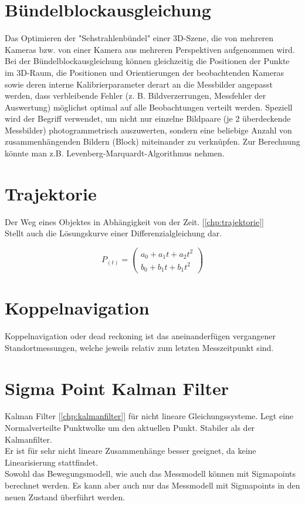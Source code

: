 \section{Bündelblockausgleichung}
\label{chp:stoffübersicht:sec:Bündelblockausgleichung}
Das Optimieren der "Sehstrahlenbündel" einer 3D-Szene, die von mehreren Kameras bzw. von einer Kamera aus mehreren Perspektiven
aufgenommen wird. Bei der Bündelblockausgleichung können gleichzeitig die Positionen der Punkte im 3D-Raum, die Positionen und
Orientierungen der beobachtenden Kameras sowie deren interne Kalibrierparameter derart an die Messbilder angepasst werden, dass
verbleibende Fehler (z. B. Bildverzerrungen, Messfehler der Auswertung) möglichst optimal auf alle Beobachtungen verteilt werden.
Speziell wird der Begriff verwendet, um nicht nur einzelne Bildpaare (je 2 überdeckende Messbilder) photogrammetrisch auszuwerten,
sondern eine beliebige Anzahl von zusammenhängenden Bildern (Block) miteinander zu verknüpfen. Zur Berechnung könnte man z.B.
Levenberg-Marquardt-Algorithmus nehmen. 

\section{Trajektorie}
\label{chp:stoffübersicht:sec:Trajektorie}
Der Weg eines Objektes in Abhängigkeit von der Zeit. [\ref{chp:trajektorie}]\\
Stellt auch die Lösungskurve einer Differenzialgleichung dar.

\begin{equation}
P_{(t)} = 
\left(
	\begin{array}{c}
	a_0 + a_1t + a_2t^2 \\
	b_0 + b_1t + b_1t^2
	\end{array} 
\right)
\end{equation} 

\section{Koppelnavigation}
\label{chp:stoffübersicht:sec:Koppelnavigation}
Koppelnavigation oder dead reckoning ist das aneinanderfügen vergangener Standortmessungen, welche jeweils relativ zum letzten Messzeitpunkt sind.

\section{Sigma Point Kalman Filter}
\label{chp:stoffübersicht:sec:SigmaPointKalmanFilter}
Kalman Filter [\ref{chp:kalmanfilter}] für nicht lineare Gleichungssysteme. Legt eine Normalverteilte Punktwolke um den aktuellen Punkt. Stabiler als der Kalmanfilter.\\
Er ist für sehr nicht lineare Zusammenhänge besser geeignet, da keine Linearisierung stattfindet.\\
Sowohl das Bewegungsmodell, wie auch das Messmodell können mit Sigmapoints berechnet werden. Es kann aber auch nur  das Messmodell mit Sigmapoints in den neuen Zustand überführt werden.

